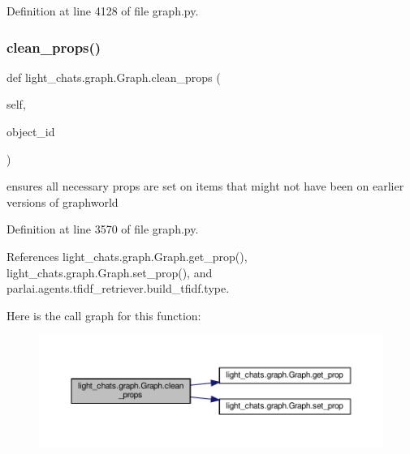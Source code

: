 Definition at line 4128 of file graph.\+py.

\mbox{\label{classlight__chats_1_1graph_1_1Graph_aa28ea4b9a270d74783f277f04170d669}} 
\subsubsection{\texorpdfstring{clean\+\_\+props()}{clean\_props()}}
{\footnotesize\ttfamily def light\+\_\+chats.\+graph.\+Graph.\+clean\+\_\+props (\begin{DoxyParamCaption}\item[{}]{self,  }\item[{}]{object\+\_\+id }\end{DoxyParamCaption})}

\begin{DoxyVerb}ensures all necessary props are set on items that might not have
been on earlier versions of graphworld
\end{DoxyVerb}
 

Definition at line 3570 of file graph.\+py.



References light\+\_\+chats.\+graph.\+Graph.\+get\+\_\+prop(), light\+\_\+chats.\+graph.\+Graph.\+set\+\_\+prop(), and parlai.\+agents.\+tfidf\+\_\+retriever.\+build\+\_\+tfidf.\+type.

Here is the call graph for this function\+:
\nopagebreak
\begin{figure}[H]
\begin{center}
\leavevmode
\includegraphics[width=350pt]{classlight__chats_1_1graph_1_1Graph_aa28ea4b9a270d74783f277f04170d669_cgraph}
\end{center}
\end{figure}
\mbox{\label{classlight__chats_1_1graph_1_1Graph_ae416efe86bf6117aec6dc1de481d0ec1}} 
